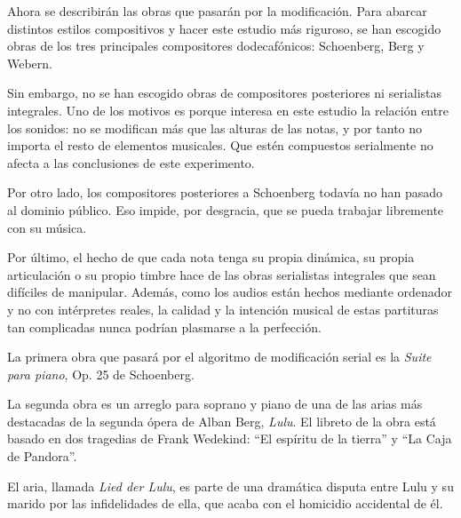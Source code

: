         Ahora se describirán las obras que pasarán por la modificación. Para abarcar distintos estilos compositivos y hacer este estudio más riguroso, se han escogido obras de los tres principales compositores dodecafónicos: Schoenberg, Berg y Webern.
        
        Sin embargo, no se han escogido obras de compositores posteriores ni serialistas integrales. Uno de los motivos es porque interesa en este estudio la relación entre los sonidos: no se modifican más que las alturas de las notas, y por tanto no importa el resto de elementos musicales. Que estén compuestos serialmente no afecta a las conclusiones de este experimento.
        
        Por otro lado, los compositores posteriores a Schoenberg todavía no han pasado al dominio público. Eso impide, por desgracia, que se pueda trabajar libremente con su música.
        
        Por último, el hecho de que cada nota tenga su propia dinámica, su propia articulación o su propio timbre hace de las obras serialistas integrales que sean difíciles de manipular. Además, como los audios están hechos mediante ordenador y no con intérpretes reales, la calidad y la intención musical de estas partituras tan complicadas nunca podrían plasmarse a la perfección.
        
        La primera obra que pasará por el algoritmo de modificación serial es la \textit{Suite para piano}, Op. 25 de Schoenberg.
        
        
        La segunda obra es un arreglo para soprano y piano de una de las arias más destacadas de la segunda ópera de Alban Berg, \textit{Lulu}. El libreto de la obra está basado en dos tragedias de Frank Wedekind: ``El espíritu de la tierra'' y ``La Caja de Pandora''.
        
        El aria, llamada \textit{Lied der Lulu}, es parte de una dramática disputa entre Lulu y su marido por las infidelidades de ella, que acaba con el homicidio accidental de él.
                
